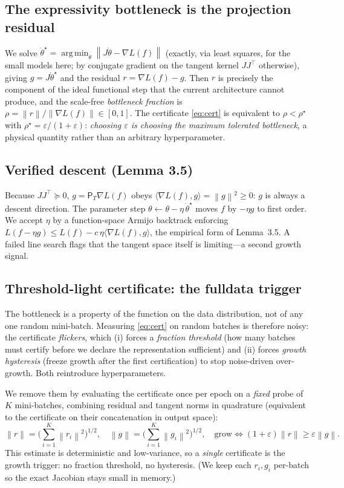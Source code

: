 \documentclass{article}
\DeclareMathOperator*{\argmin}{arg\,min}
\newcommand{\norm}[1]{\left\lVert #1 \right\rVert}
\newcommand{\inner}[2]{\langle #1, #2 \rangle}
\newcommand{\grad}{\nabla}
\newcommand{\PT}{\mathsf{P}_{T}}
\newcommand{\eps}{\varepsilon}
\begin{document}
\subsection{The expressivity bottleneck is the projection residual}
We solve $\dot\theta^\star=\argmin_{\dot\theta}\norm{J\dot\theta-\grad L(f)}$
(exactly, via least squares, for the small models here; by conjugate gradient on
the tangent kernel $JJ^\top$ otherwise), giving $g=J\dot\theta^\star$ and the
residual $r=\grad L(f)-g$. Then $r$ is precisely the component of the ideal
functional step that the current architecture cannot produce, and the scale-free
\emph{bottleneck fraction} is $\rho=\norm{r}/\norm{\grad L(f)}\in[0,1]$. The
certificate \eqref{eq:cert} is equivalent to $\rho<\rho^\star$ with
$\rho^\star=\eps/(1+\eps)$: \emph{choosing $\eps$ is choosing the maximum
tolerated bottleneck}, a physical quantity rather than an arbitrary
hyperparameter.

\subsection{Verified descent (Lemma 3.5)}
Because $JJ^\top\succeq0$, $g=\PT\grad L(f)$ obeys
$\inner{\grad L(f)}{g}=\norm{g}^2\ge0$: $g$ is always a descent direction. The
parameter step $\theta\leftarrow\theta-\eta\,\dot\theta^\star$ moves $f$ by
$-\eta g$ to first order. We accept $\eta$ by a function-space Armijo backtrack
enforcing $L(f-\eta g)\le L(f)-c\,\eta\inner{\grad L(f)}{g}$, the empirical form
of Lemma~3.5. A failed line search flags that the tangent space itself is
limiting---a second growth signal.

\subsection{Threshold-light certificate: the fulldata trigger}\label{sec:stable}
The bottleneck is a property of the function on the data distribution, not of any
one random mini-batch. Measuring \eqref{eq:cert} on random batches is therefore
noisy: the certificate \emph{flickers}, which (i) forces a \emph{fraction
threshold} (how many batches must certify before we declare the representation
sufficient) and (ii) forces \emph{growth hysteresis} (freeze growth after the
first certification) to stop noise-driven over-growth. Both reintroduce
hyperparameters.

We remove them by evaluating the certificate once per epoch on a \emph{fixed}
probe of $K$ mini-batches, combining residual and tangent norms in quadrature
(equivalent to the certificate on their concatenation in output space):
\begin{equation}
  \norm{r}=\Big(\textstyle\sum_{i=1}^K\norm{r_i}^2\Big)^{1/2},\quad
  \norm{g}=\Big(\textstyle\sum_{i=1}^K\norm{g_i}^2\Big)^{1/2},\quad
  \text{grow} \iff (1+\eps)\norm{r}\ge\eps\norm{g}.
\end{equation}
This estimate is deterministic and low-variance, so a \emph{single} certificate is
the growth trigger: no fraction threshold, no hysteresis. (We keep each
$r_i,g_i$ per-batch so the exact Jacobian stays small in memory.)
\end{document}
